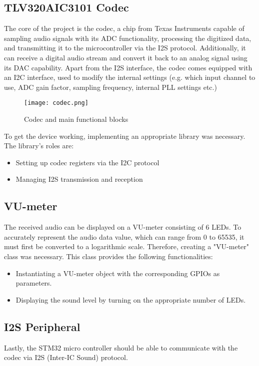 \documentclass[10pt,a4]{article}
\begin{document}
\subsection{TLV320AIC3101 Codec}
The core of the project is the codec, a chip from Texas Instruments capable of sampling audio signals with its ADC functionality, processing the digitized data, and transmitting it to the microcontroller via the I2S protocol. Additionally, it can receive a digital audio stream and convert it back to an analog signal using its DAC capability. Apart from the I2S interface, the codec comes equipped with an I2C interface, used to modify the internal settings (e.g. which input channel to use, ADC gain factor, sampling frequency, internal PLL settings etc.)

    \begin{figure}[ht]
        \centering
        \texttt{[image: codec.png]}
        \caption{Codec and main functional blocks}
    \end{figure}

To get the device working, implementing an appropriate library was necessary. The library's roles are:

\begin{itemize}
\item Setting up codec registers via the I2C protocol
\item Managing I2S transmission and reception
\end{itemize}

\subsection{VU-meter}
The received audio can be displayed on a VU-meter consisting of 6 LEDs. To accurately represent the audio data value, which can range from 0 to 65535, it must first be converted to a logarithmic scale. Therefore, creating a "VU-meter" class was necessary. This class provides the following functionalities:

\begin{itemize}
\item Instantiating a VU-meter object with the corresponding GPIOs as parameters.
\item Displaying the sound level by turning on the appropriate number of LEDs.
\end{itemize}

\subsection{I2S Peripheral}
Lastly, the STM32 micro controller should be able to communicate with the codec via I2S (Inter-IC Sound) protocol. 
\end{document}
